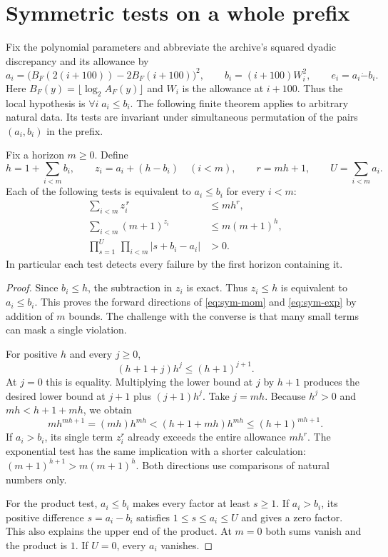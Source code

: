 \section{Symmetric tests on a whole prefix}\label{sec:symmetric-prefixes}
Fix the polynomial parameters and abbreviate the archive's squared dyadic discrepancy and its allowance by
\[
 a_i=\bigl(B_F(2(i+100))-2B_F(i+100)\bigr)^2,\qquad
 b_i=(i+100)W_i^2,\qquad e_i=a_i\mathbin{\dot-}b_i .
\]
Here $B_F(y)=\lfloor\log_2 A_F(y)\rfloor$ and $W_i$ is the allowance at $i+100$. Thus the local hypothesis is $\forall i\;a_i\le b_i$. The following finite theorem applies to arbitrary natural data. Its tests are invariant under simultaneous permutation of the pairs $(a_i,b_i)$ in the prefix.

\begin{theorem}\label{thm:symmetric-prefix}
Fix a horizon $m\ge0$. Define
\[
 h=1+\sum_{i<m} b_i,\qquad z_i=a_i+(h-b_i)\quad(i<m),
 \qquad r=mh+1,\qquad U=\sum_{i<m}a_i.
\]
Each of the following tests is equivalent to $a_i\le b_i$ for every $i<m$:
\begin{align}
 \sum_{i<m} z_i^{\,r}&\le m h^r, \label{eq:sym-mom}\\
 \sum_{i<m}(m+1)^{z_i}&\le m(m+1)^h, \label{eq:sym-exp}\\
 \prod_{s=1}^{U}\,\prod_{i<m}\left|s+b_i-a_i\right|&>0 .
 \label{eq:sym-char}
\end{align}
In particular each test detects every failure by the first horizon containing it.
\end{theorem}
\begin{proof}
Since $b_i\le h$, the subtraction in $z_i$ is exact. Thus $z_i\le h$ is equivalent to $a_i\le b_i$. This proves the forward directions of \eqref{eq:sym-mom} and \eqref{eq:sym-exp} by addition of $m$ bounds. The challenge with the converse is that many small terms can mask a single violation.

For positive $h$ and every $j\ge0$,
\[
 (h+1+j)h^j\le(h+1)^{j+1}.
\]
At $j=0$ this is equality. Multiplying the lower bound at $j$ by $h+1$ produces the desired lower bound at $j+1$ plus $(j+1)h^j$. Take $j=mh$. Because $h^j>0$ and $mh<h+1+mh$, we obtain
\[
 m h^{mh+1}=(mh)h^{mh}<(h+1+mh)h^{mh}\le(h+1)^{mh+1}.
\]
If $a_i>b_i$, its single term $z_i^r$ already exceeds the entire allowance $mh^r$. The exponential test has the same implication with a shorter calculation: $(m+1)^{h+1}>m(m+1)^h$. Both directions use comparisons of natural numbers only.

For the product test, $a_i\le b_i$ makes every factor at least $s\ge1$. If $a_i>b_i$, its positive difference $s=a_i-b_i$ satisfies $1\le s\le a_i\le U$ and gives a zero factor. This also explains the upper end of the product. At $m=0$ both sums vanish and the product is $1$. If $U=0$, every $a_i$ vanishes.
\end{proof}

